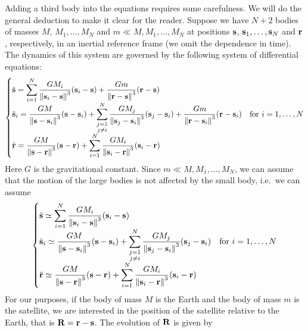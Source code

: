 \documentclass[../main.tex]{subfiles}
\begin{document}
Adding a third body into the equations requires some carefulness. We will do the general deduction to make it clear for the reader. Suppose we have $N+2$ bodies of masses $M$, $M_1,\ldots, M_N$ and $m\ll M,M_1,\ldots,M_N$ at positions $\vf{s}$, $\vf{s}_1,\ldots,\vf{s}_N$ and $\vf{r}$, respectively, in an inertial reference frame (we omit the dependence in time). The dynamics of this system are governed by the following system of differential equations:
\begin{equation}
  \begin{cases}
    \displaystyle \ddot{\vf{s}}=\sum_{i=1}^N\frac{GM_i}{\norm{\vf{s}_i-\vf{s}}^3}(\vf{s}_i-\vf{s})      +\frac{Gm}{\norm{\vf{r}-\vf{s}}^3}(\vf{r}-\vf{s}) \\
    \displaystyle \ddot{\vf{s}}_i=\frac{GM}{\norm{\vf{s}-\vf{s}_i}^3}(\vf{s}-\vf{s}_i)+\sum_{\substack{j=1                                                \\j\ne i}}^N\frac{GM_j}{\norm{\vf{s}_j-\vf{s}_i}^3}(\vf{s}_j-\vf{s}_i)+\frac{Gm}{\norm{\vf{r}-\vf{s}_i}^3}(\vf{r}-\vf{s}_i)& \text{for } i=1,\ldots, N \\
    \displaystyle \ddot{\vf{r}}=\frac{GM}{\norm{\vf{s}-\vf{r}}^3}(\vf{s}-\vf{r})+\sum_{i=1}^N\frac{GM_i}{\norm{\vf{s}_i-\vf{r}}^3}(\vf{s}_i-\vf{r})
  \end{cases}
\end{equation}
Here $G$ is the gravitational constant. Since $m\ll M,M_1,\ldots,M_N$, we can assume that the motion of the large bodies is not affected by the small body, i.e.\ we can assume
\begin{equation}
  \begin{cases}
    \displaystyle \ddot{\vf{s}}\simeq \sum_{i=1}^N\frac{GM_i}{\norm{\vf{s}_i-\vf{s}}^3}(\vf{s}_i-\vf{s})        \\
    \displaystyle \ddot{\vf{s}}_i\simeq\frac{GM}{\norm{\vf{s}-\vf{s}_i}^3}(\vf{s}-\vf{s}_i)+\sum_{\substack{j=1 \\j\ne i}}^N\frac{GM_j}{\norm{\vf{s}_j-\vf{s}_i}^3}(\vf{s}_j-\vf{s}_i)& \text{for } i=1,\ldots, N \\
    \displaystyle \ddot{\vf{r}}\simeq\frac{GM}{\norm{\vf{s}-\vf{r}}^3}(\vf{s}-\vf{r})+\sum_{i=1}^N\frac{GM_i}{\norm{\vf{s}_i-\vf{r}}^3}(\vf{s}_i-\vf{r})
  \end{cases}
\end{equation}
For our purposes, if the body of mass $M$ is the Earth and the body of mass $m$ is the satellite, we are interested in the position of the satellite relative to the Earth, that is $\vf{R}=\vf{r}-\vf{s}$. The evolution of $\vf{R}$ is given by
\end{document}
